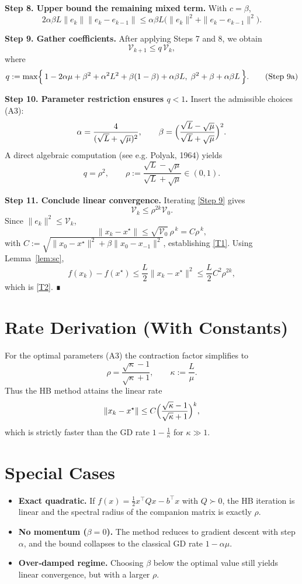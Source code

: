 \documentclass[11pt]{article}
\begin{document}
\noindent\textbf{Step 8. Upper bound the remaining mixed term.}  
With $c=\beta$,
\[
2\alpha\beta L\|e_k\|\|e_k-e_{k-1}\|
\le \alpha\beta L\bigl(\|e_k\|^{2}+\|e_k-e_{k-1}\|^{2}\bigr).
\tag{Step 8}
\]

\noindent\textbf{Step 9. Gather coefficients.}  
After applying Steps 7 and 8, we obtain
\[
\mathcal{V}_{k+1}\le q\,\mathcal{V}_k,
\tag{Step 9}
\]
where
\[
q:=\max\Bigl\{\,1-2\alpha\mu+\beta^{2}+\alpha^{2}L^{2}+\beta(1-\beta)+\alpha\beta L,\;
\beta^{2}+\beta+\alpha\beta L\,\Bigr\}.
\tag{Step 9a}
\]

\noindent\textbf{Step 10. Parameter restriction ensures $q<1$.}  
Insert the admissible choices (A3):
\[
\alpha=\frac{4}{(\sqrt{L}+\sqrt{\mu})^{2}},\qquad
\beta=\Bigl(\frac{\sqrt{L}-\sqrt{\mu}}{\sqrt{L}+\sqrt{\mu}}\Bigr)^{2}.
\]
A direct algebraic computation (see e.g. Polyak, 1964) yields
\[
q=\rho^{2},\qquad \rho:=\frac{\sqrt{L}-\sqrt{\mu}}{\sqrt{L}+\sqrt{\mu}}\in(0,1).
\tag{Step 10}
\]

\noindent\textbf{Step 11. Conclude linear convergence.}  
Iterating \eqref{Step 9} gives
\[
\mathcal{V}_{k}\le \rho^{2k}\mathcal{V}_{0}.
\tag{Step 11}
\]
Since $\|e_k\|^{2}\le\mathcal{V}_{k}$,
\[
\|x_k-x^\star\|\le \sqrt{\mathcal{V}_{0}}\,\rho^{\,k}
   =C\rho^{\,k},
\]
with $C:=\sqrt{\|x_0-x^\star\|^{2}+\beta\|x_0-x_{-1}\|^{2}}$, establishing \eqref{T1}.  
Using Lemma~\ref{lem:sc},
\[
f(x_k)-f(x^\star)\le\frac{L}{2}\|x_k-x^\star\|^{2}
\le\frac{L}{2}C^{2}\rho^{2k},
\]
which is \eqref{T2}. ∎

\section*{Rate Derivation (With Constants)}
For the optimal parameters (A3) the contraction factor simplifies to
\[
\rho=\frac{\sqrt{\kappa}-1}{\sqrt{\kappa}+1},
\qquad \kappa:=\frac{L}{\mu}.
\]
Thus the HB method attains the linear rate
\[
\|x_k-x^\star\|\le C\Bigl(\frac{\sqrt{\kappa}-1}{\sqrt{\kappa}+1}\Bigr)^{k},
\]
which is strictly faster than the GD rate $1-\frac{1}{\kappa}$ for $\kappa\gg1$.

\section*{Special Cases}
\begin{itemize}
\item \textbf{Exact quadratic.} If $f(x)=\frac{1}{2}x^{\top}Qx-b^{\top}x$ with $Q\succ0$, the HB iteration is linear and the spectral radius of the companion matrix is exactly $\rho$.
\item \textbf{No momentum ($\beta=0$).} The method reduces to gradient descent with step $\alpha$, and the bound collapses to the classical GD rate $1-\alpha\mu$.
\item \textbf{Over‑damped regime.} Choosing $\beta$ below the optimal value still yields linear convergence, but with a larger $\rho$.
\end{itemize}
\end{document}
